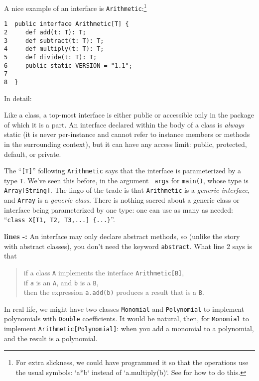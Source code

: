 A nice example of an interface is {\tt Arithmetic}:\footnote{For extra
slickness, we could have programmed it so that the operations use the usual
symbols: \xcd`a*b` instead of \xcd`a.multiply(b)`.  See  for
how to do this.}
\begin{verbatim}
1  public interface Arithmetic[T] { 
2     def add(t: T): T; 
3     def subtract(t: T): T;
4     def multiply(t: T): T;
5     def divide(t: T): T;
6     public static VERSION = "1.1";   
7  
8  }
\end{verbatim}

In detail: 
\begin{description}
\item[line {\bf {}:}] 
Like a class, a top-most interface is either public or accessible only in the
package of which it is a part. An interface declared within the body of a
class is {\em always} static (it is never per-instance and cannot refer to
instance members or methods in the surrounding context), but it can have any
access limit: public, protected, default, or private.

The ``{\tt [T]}'' following {\tt Arithmetic} says that the interface is
parameterized by a type {\tt T}. We've seen this before, in the argument {\tt
  args} for {\tt main()}, whose type is {\tt Array[String]}. The lingo of the
trade is that {\tt Arithmetic} is a {\em generic interface}, and {\tt Array}
is a {\em generic class}. There is nothing sacred about a generic class or
interface being parameterized by one type: one can use as many as needed:
``{\tt class X[T1, T2, T3,...] \{...\}}''.


\item{\bf lines -:} An interface may only declare abstract methods, so (unlike the story
with abstract classes), you don't need the keyword {\tt abstract}.  What line 2 says is that
\begin{quote}
if a class {\tt A} implements the interface {\tt Arithmetic[B]},\\
if {\tt a} is an {\tt A}, and {\tt b} is a {\tt B}, \\
then the expression {\tt a.add(b)} produces a result that is a {\tt B}.
\end{quote}
In real life, we might have two classes {\tt Monomial} and {\tt Polynomial} to 
implement polynomials with {\tt Double} coefficients.  It would be natural, then,
for {\tt Monomial} to implement {\tt Arithmetic[Polynomial]}: when you add a monomial
to a polynomial, and the result is a polynomial.


\end{description}
